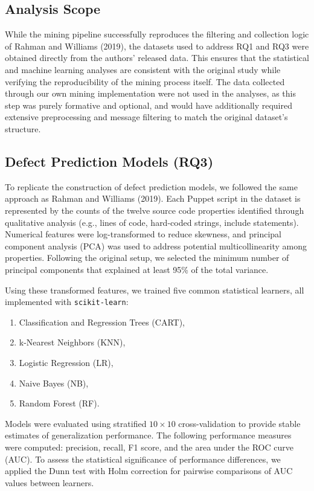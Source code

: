 \documentclass[conference]{IEEEtran}
\begin{document}
	\subsection{Analysis Scope}
	While the mining pipeline successfully reproduces the filtering and collection logic of Rahman and Williams (2019), the datasets used to address RQ1 and RQ3 were obtained directly from the authors’ released data. This ensures that the statistical and machine learning analyses are consistent with the original study while verifying the reproducibility of the mining process itself. The data collected through our own mining implementation were not used in the analyses, as this step was purely formative and optional, and would have additionally required extensive preprocessing and message filtering to match the original dataset’s structure.
	\subsection{Defect Prediction Models (RQ3)}
	To replicate the construction of defect prediction models, we followed the same approach as Rahman and Williams (2019). 
	Each Puppet script in the dataset is represented by the counts of the twelve source code properties identified through qualitative analysis (e.g., lines of code, hard-coded strings, include statements). 
	Numerical features were log-transformed to reduce skewness, and principal component analysis (PCA) was used to address potential multicollinearity among properties. 
	Following the original setup, we selected the minimum number of principal components that explained at least 95\% of the total variance.
	
	Using these transformed features, we trained five common statistical learners, all implemented with \texttt{scikit-learn}: 
	\begin{enumerate}
		\item Classification and Regression Trees (CART),
		\item k-Nearest Neighbors (KNN),
		\item Logistic Regression (LR),
		\item Naive Bayes (NB),
		\item Random Forest (RF).
	\end{enumerate}
	
	Models were evaluated using stratified $10 \times 10$ cross-validation to provide stable estimates of generalization performance. 
	The following performance measures were computed: precision, recall, F1 score, and the area under the ROC curve (AUC). 
	To assess the statistical significance of performance differences, we applied the Dunn test with Holm correction for pairwise comparisons of AUC values between learners. 
	
\end{document}
